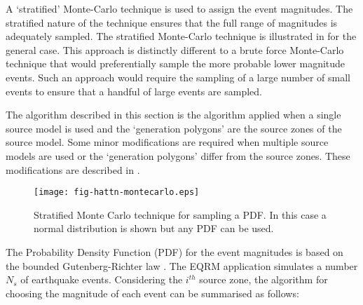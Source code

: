 A `stratified' Monte-Carlo technique is used to assign the event
magnitudes. The stratified nature of the technique ensures that
the full range of magnitudes is adequately sampled. The stratified
Monte-Carlo technique is illustrated in
 for the general case. This approach is
distinctly different to a brute force Monte-Carlo technique that
would preferentially sample the more probable lower magnitude
events. Such an approach would require the sampling of a large
number of small events to ensure that a handful of large events
are sampled.

The algorithm described in this section is the algorithm applied
when a single source model is used and the `generation
polygons' are the source zones of the
source model. Some minor modifications are required when multiple
source models are used or the `generation
polygons' differ from the source zones.
These modifications are described in .


\begin{figure}[htp]
\texttt{[image: fig-hattn-montecarlo.eps]}
\caption{Stratified Monte Carlo technique for sampling a PDF. In
this case a normal distribution is shown but any PDF can be used.}
\label{fig-hattn-montecarlo}
\end{figure}

The Probability Density Function (PDF) for the event magnitudes is
based on the bounded Gutenberg-Richter law \citep{dr_Kramer96a}.
The EQRM application simulates a number $N_s$ of earthquake
events. Considering the $i^{th}$ source zone, the algorithm for
choosing the magnitude of each event can be summarised as follows:

